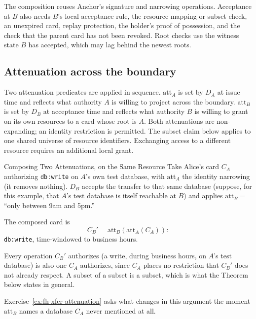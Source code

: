 \documentclass[11pt,a4paper]{article}
\theoremstyle{definition}
\theoremstyle{remark}
\begin{document}
The composition reuses Anchor's signature and narrowing operations.
Acceptance at $B$ also needs $B$'s local acceptance rule, the resource
mapping or subset check, an unexpired card, replay protection, the holder's
proof of possession, and the check that the parent card has not been revoked. Root checks use the witness state
$B$ has accepted, which may lag behind the newest roots.

\subsection{Attenuation across the boundary}\label{sec:fh-xfer-att}

Two attenuation predicates are applied in sequence. $\mathrm{att}_A$ is set by $D_A$ at issue time and reflects what authority $A$ is willing to project across the boundary. $\mathrm{att}_B$ is set by $D_B$ at acceptance time and reflects what authority $B$ is willing to grant on its own resources to a card whose root is $A$. Both attenuations are non-expanding; an identity restriction is permitted.
The subset claim below applies to one shared universe of resource identifiers.
Exchanging access to a different resource requires an additional local grant.

\begin{pdexample}{Composing Two Attenuations, on the Same Resource}
\setlength{\parskip}{4pt plus 1pt}
Take Alice's card $C_A$ authorizing \texttt{db:write} on $A$'s own test database, with $\mathrm{att}_A$ the identity narrowing (it removes nothing). $D_B$ accepts the transfer to that same database (suppose, for this example, that $A$'s test database is itself reachable at $B$) and applies $\mathrm{att}_B=$ ``only between 9am and 5pm.''

The composed card is \[
C_B'=\mathrm{att}_B(\mathrm{att}_A(C_A)):
\] \texttt{db:write}, time-windowed to business hours.

Every operation $C_B'$ authorizes (a write, during business hours, on $A$'s test database) is also one $C_A$ authorizes, since $C_A$ places no restriction that $C_B'$ does not already respect. A subset of a subset is a subset, which is what the Theorem below states in general.

Exercise~\ref{ex:fh-xfer-attenuation} asks what changes in this argument the moment $\mathrm{att}_B$ names a database $C_A$ never mentioned at all.
\end{pdexample}
\end{document}
